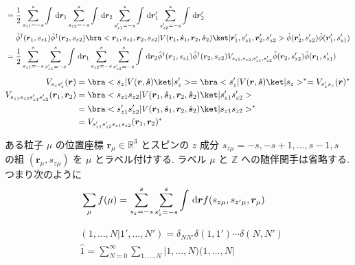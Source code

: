 \documentclass[uplatex,dvipdfmx,a4paper,11pt]{jlreq}
\newcommand{\RR}{\mathbb{R}}
\newcommand{\ZZ}{\mathbb{Z}}
\newcommand{\rr}{\bm{r}}
\renewcommand{\ss}{\bm{s}}
\numberwithin{equation}{section}
\theoremstyle{definition}
\begin{document}
\begin{example}[Q21-87, Q21-88, Q21-89(i)(ii), Q21-90, Q21-91(i)(ii)(iii)(iv), Q21-92]
\begin{align}
                           & = \frac{1}{2}\sum_{s_{z1} = -s}^s\int\dl{\rr_1}\sum_{s_{z2} = -s}^s\int\dl{\rr_2}\sum_{s_{z1}' = -s}^s\int\dl{\rr_1'}\sum_{s_{z2}' = -s}^s\int\dl{\rr_2'}                                                                                                                             \\
                           & \quad\ \hat{\phi}^\dagger(\rr_1, s_{z1})\hat{\phi}^\dagger(\rr_2, s_{z2})\bra<\rr_1,s_{z1},\rr_2,s_{z2}|V(\rr_1, \hat{\ss}_1, \rr_2, \hat{\ss}_2)\ket|\rr_1',s_{z1}',\rr_2',s_{z2}'>\hat{\phi}(\rr_2', s_{z2}')\hat{\phi}(\rr_1', s_{z1}')                                            \\
                           & = \frac{1}{2}\sum_{s_{z1} = -s}^s\sum_{s_{z1}' = -s}^s\int\dl{\rr_1}\sum_{s_{z2} = -s}^s\sum_{s_{z2}' = -s}^s\int\dl{\rr_2}\hat{\phi}^\dagger(\rr_1, s_{z1})\hat{\phi}^\dagger(\rr_2, s_{z2})V_{s_{z1}, s_{z2}, s_{z1}', s_{z2}'}\hat{\phi}(\rr_2, s_{z2}')\hat{\phi}(\rr_1, s_{z1}')
  \end{align}
  \begin{align}
    V_{s_zs_z'}(\rr)                             & = \bra<s_z|V(\rr, \hat{\ss})\ket|s_z'> = \bra<s_z'|V(\rr, \hat{\ss})\ket|s_z>^* = V_{s_z's_z}(\rr)^* \\
    V_{s_{z1}s_{z2}s_{z1}'s_{z2}'}(\rr_1, \rr_2) & = \bra<s_{z1}s_{z2}|V(\rr_1, \hat{\ss}_1, \rr_2, \hat{\ss}_2)\ket|s_{z1}'s_{z2}'>                    \\
                                                 & = \bra<s_{z1}'s_{z2}'|V(\rr_1, \hat{\ss}_1, \rr_2, \hat{\ss}_2)\ket|s_{z1}s_{z2}>^*                  \\
                                                 & = V_{s_{z1}'s_{z2}'s_{z1}s_{z2}}(\rr_1, \rr_2)^*
  \end{align}
\end{example}
\begin{definition}[省略記法]
  ある粒子 $\mu$ の位置座標 $\rr_\mu\in\RR^3$ とスピンの $z$ 成分 $s_{z\mu} = -s,-s+1,\ldots,s-1,s$ の組 $(\rr_\mu, s_{z\mu})$ を $\mu$ とラベル付けする. ラベル $\mu$ と $\ZZ$ への随伴関手は省略する.
  つまり次のように
  \begin{align}
     & \sum_{\mu}f(\mu) = \sum_{s_z = -s}^{s}\sum_{s_z' = -s}^{s}\int\dl{\rr}f(s_{z\mu}, s_{z'\mu}, \rr_\mu)
  \end{align}
\end{definition}
\begin{align}
   & (1,\ldots,N|1',\ldots,N') = \delta_{NN'}\delta(1, 1')\cdots\delta(N, N') \\
   & \hat{1} = \sum_{N = 0}^{\infty}\sum_{1,\ldots,N}|1,\ldots,N)(1,\ldots,N|
\end{align}
\end{document}
